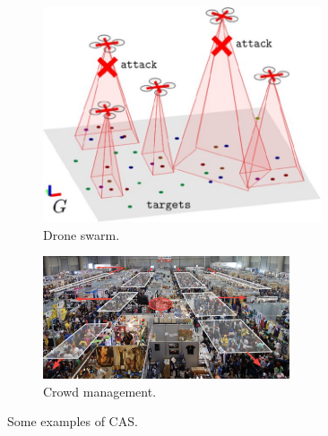 \documentclass[12pt,a4paper,openright,twoside]{book}
\begin{document}
\begin{figure}[h]
  \centering
  \begin{subfigure}[b]{0.49\textwidth}
    \centering
    \includegraphics[width=0.9\textwidth]{figures/swarm2.jpeg}
    \caption{Drone swarm.}
  \end{subfigure}

  \begin{subfigure}[b]{0.49\textwidth}
    \centering
    \includegraphics[width=0.8\textwidth]{figures/crowd.png}
    \caption{Crowd management.}
    \label{fig:cas-examples}
  \end{subfigure}
  \caption{Some examples of CAS.}
\end{figure}
\end{document}
